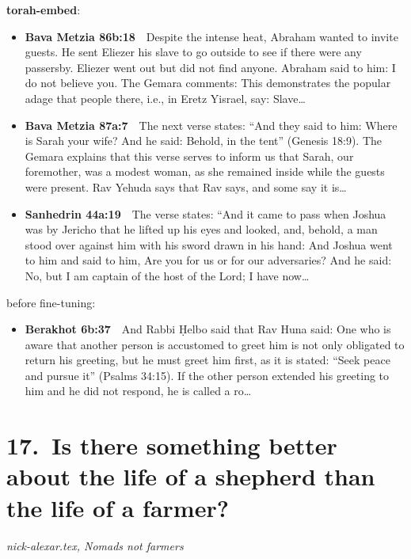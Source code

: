 \documentclass[11pt,a4paper]{article}
\begin{document}
{\color{quiet}\small\textbf{torah-embed}:}
\begin{itemize}[leftmargin=1.2em,itemsep=3pt]
\item {\color{ref}\textbf{Bava Metzia 86b:18}}\ \ Despite the intense heat, Abraham wanted to invite guests. He sent Eliezer his slave to go outside to see if there were any passersby. Eliezer went out but did not find anyone. Abraham said to him: I do not believe you. The Gemara comments: This demonstrates the popular adage that people there, i.e., in Eretz Yisrael, say: Slave\ldots
\item {\color{ref}\textbf{Bava Metzia 87a:7}}\ \ The next verse states: “And they said to him: Where is Sarah your wife? And he said: Behold, in the tent” (Genesis 18:9). The Gemara explains that this verse serves to inform us that Sarah, our foremother, was a modest woman, as she remained inside while the guests were present. Rav Yehuda says that Rav says, and some say it is\ldots
\item {\color{ref}\textbf{Sanhedrin 44a:19}}\ \ The verse states: “And it came to pass when Joshua was by Jericho that he lifted up his eyes and looked, and, behold, a man stood over against him with his sword drawn in his hand: And Joshua went to him and said to him, Are you for us or for our adversaries? And he said: No, but I am captain of the host of the Lord; I have now\ldots
\end{itemize}
{\color{quiet}\small before fine-tuning:}
\begin{itemize}[leftmargin=1.2em]
\item {\color{ref}\textbf{Berakhot 6b:37}}\ \ And Rabbi Ḥelbo said that Rav Huna said: One who is aware that another person is accustomed to greet him is not only obligated to return his greeting, but he must greet him first, as it is stated: “Seek peace and pursue it” (Psalms 34:15). If the other person extended his greeting to him and he did not respond, he is called a ro\ldots
\end{itemize}

\section*{17.\ Is there something better about the life of a shepherd than the life of a farmer?}
{\color{quiet}\small\textit{nick-alexar.tex, Nomads not farmers}}
\end{document}

